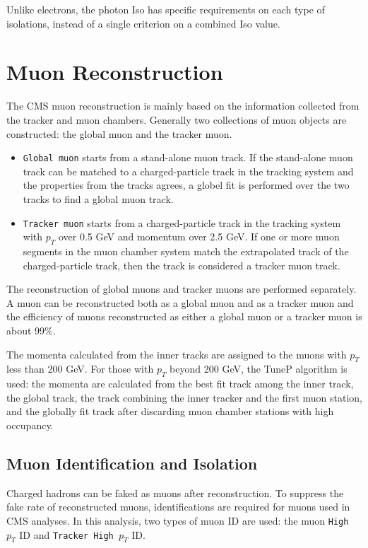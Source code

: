 \vspace{0.3cm}
Unlike electrons, the photon Iso has specific requirements on each type of isolations, instead of a single criterion on a combined Iso value.

\section{Muon Reconstruction}\label{sec:muonrecon}
The CMS muon reconstruction is mainly based on the information collected from the tracker and muon chambers. Generally two collections of muon objects are constructed: the global muon and the tracker muon.~\cite{ob_muonconst}
\begin{itemize}
\item \texttt{Global muon} starts from a stand-alone muon track. If the stand-alone muon track can be matched to a charged-particle track in the tracking system and the properties from the tracks agrees, a globel fit is performed over the two tracks to find a global muon track.
\item \texttt{Tracker muon} starts from a charged-particle track in the tracking system with $p_{T}$ over 0.5 GeV and momentum over 2.5 GeV. If one or more muon segments in the muon chamber system match the extrapolated track of the charged-particle track, then the track is considered a tracker muon track.
\end{itemize}

The reconstruction of global muons and tracker muons are performed separately. A muon can be reconstructed both as a global muon and as a tracker muon and the efficiency of muons reconstructed as either a global muon or a tracker muon is about 99\%.

\vspace{0.3cm}
The momenta calculated from the inner tracks are assigned to the muons with $p_{T}$ less than 200 GeV. For those with $p_T$ beyond 200 GeV, the TuneP algorithm is used: the momenta are calculated from the best fit track among the inner track, the global track, the track combining the inner tracker and the first muon station, and the globally fit track after discarding muon chamber stations with high occupancy. 

\subsection{Muon Identification and Isolation}
Charged hadrons can be faked as muons after reconstruction. To suppress the fake rate of reconstructed muons, identifications are required for muons used in CMS analyses. In this analysis, two types of muon ID are used: the muon \texttt{High $p_T$} ID and \texttt{Tracker High $p_T$} ID. 

